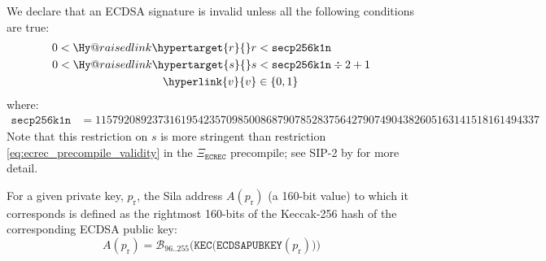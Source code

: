 \documentclass[9pt,oneside]{amsart}
\makeatletter
\newcommand{\linkdest}[1]{\Hy@raisedlink{\hypertarget{#1}{}}}
\makeatother
\begin{document}
\linkdest{invalidsig}We declare that an ECDSA signature is invalid unless all the following conditions are true:
\begin{align}
0 < \linkdest{r}{r} &< \mathtt{secp256k1n} \\
0 < \linkdest{s}{s} &< \mathtt{secp256k1n} \div 2 + 1 \\
\hyperlink{v}{v} &\in \{0,1\}
\end{align}
where:
\begin{align}
\mathtt{secp256k1n} &= 115792089237316195423570985008687907852837564279074904382605163141518161494337
\end{align}
Note that this restriction on $s$ is more stringent than restriction \ref{eq:ecrec_precompile_validity} in the $\Xi_{\mathtt{ECREC}}$ precompile; see SIP-2 by \cite{SIP-2} for more detail.

For a given private key, $p_{\mathrm{r}}$, the Sila address $A(p_{\mathrm{r}})$ (a 160-bit value) to which it corresponds is defined as the rightmost 160-bits of the Keccak-256 hash of the corresponding ECDSA public key:
\begin{equation}
A(p_{\mathrm{r}}) = \mathcal{B}_{96..255}\big(\mathtt{KEC}\big( \mathtt{ECDSAPUBKEY}(p_{\mathrm{r}}) \big) \big)
\end{equation}
\end{document}
